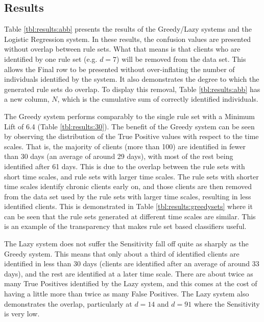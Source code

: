 
\subsection{Results} \label{chap:results:rugresults}

Table \ref{tbl:results:abb} presents the results of the Greedy/Lazy systems and the Logistic Regression system.
In these results, the confusion values are presented without overlap between rule sets. What that means is that clients who are identified by one rule set (e.g. $d=7$) will be removed from the data set. This allows the Final row to be presented without over-inflating the number of individuals identified by the system. It also demonstrates the degree to which the generated rule sets do overlap. To display this removal, Table \ref{tbl:results:abb} has a new column, $N$, which is the cumulative sum of correctly identified individuals.

The Greedy system performs comparably to the single rule set with a Minimum Lift of 6.4 (Table \ref{tbl:results:30}). The benefit of the Greedy system can be seen by observing the distribution of the True Positive values with respect to the time scales. That is, the majority of clients (more than 100) are identified in fewer than 30 days (an average of around 29 days), with most of the rest being identified after 61 days. This is due to the overlap between the rule sets with short time scales, and rule sets with larger time scales. The rule sets with shorter time scales identify chronic clients early on, and those clients are then removed from the data set used by the rule sets with larger time scales, resulting in less identified clients. This is demonstrated in Table \ref{tbl:results:greedysets} where it can be seen that the rule sets generated at different time scales are similar. This is an example of the transparency that makes rule set based classifiers useful.

The Lazy system does not suffer the Sensitivity fall off quite as sharply as the Greedy system. This means that only about a third of identified clients are identified in less than 30 days (clients are identified after an average of around 33 days), and the rest are identified at a later time scale. There are about twice as many True Positives identified by the Lazy system, and this comes at the cost of having a little more than twice as many False Positives. The Lazy system also demonstrates the overlap, particularly at $d=14$ and $d=91$ where the Sensitivity is very low.

